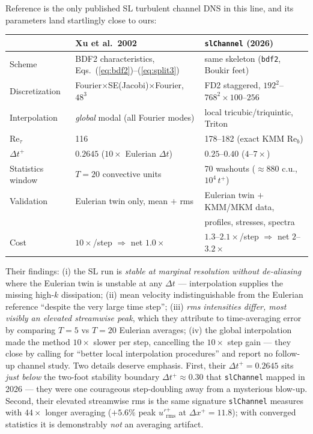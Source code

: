 \documentclass[11pt,a4paper]{article}
\newcommand{\Ret}{\mathrm{Re}_\tau}
\newcommand{\Reb}{\mathrm{Re}_b}
\newcommand{\dtp}{\Delta t^{+}}
\begin{document}
Reference \cite{xu02} is the only published SL turbulent channel DNS in this
line, and its parameters land startlingly close to ours:
\begin{center}
\begin{tabular}{lll}
\toprule
 & Xu et al.\ 2002 \cite{xu02} & \texttt{slChannel} (2026) \\
\midrule
Scheme & BDF2 characteristics, Eqs.~(\ref{eq:bdf2})--(\ref{eq:split3})
       & same skeleton (\texttt{bdf2}, Boukir feet) \\
Discretization & Fourier$\times$SE(Jacobi)$\times$Fourier, $48^3$
               & FD2 staggered, $192^2$--$768^2\times100$--$256$ \\
Interpolation & \emph{global} modal (all Fourier modes)
              & local tricubic/triquintic, Triton \\
$\Ret$ & 116 & 178--182 (exact KMM $\Reb$) \\
$\dtp$ & $0.2645$ ($10\times$ Eulerian $\Delta t$)
       & $0.25$--$0.40$ ($4$--$7\times$) \\
Statistics window & $T=20$ convective units
                  & 70 washouts ($\approx 880$ c.u., $10^4\,t^{+}$) \\
Validation & Eulerian twin only, mean $+$ rms
           & Eulerian twin $+$ KMM/MKM data, \\
 & & profiles, stresses, spectra \\
Cost & $10\times$/step $\Rightarrow$ net $1.0\times$
     & $1.3$--$2.1\times$/step $\Rightarrow$ net $2$--$3.2\times$ \\
\bottomrule
\end{tabular}
\end{center}
Their findings: (i) the SL run is \emph{stable at marginal resolution without
de-aliasing} where the Eulerian twin is unstable at any $\Delta t$ ---
interpolation supplies the missing high-$k$ dissipation; (ii) mean velocity
indistinguishable from the Eulerian reference ``despite the very large time
step''; (iii) \emph{rms intensities differ, most visibly an elevated
streamwise peak}, which they attribute to time-averaging error by comparing
$T=5$ vs $T=20$ Eulerian averages; (iv) the global interpolation made the
method $10\times$ slower per step, cancelling the $10\times$ step gain ---
they close by calling for ``better local interpolation procedures'' and
report no follow-up channel study. Two details deserve emphasis. First,
their $\dtp=0.2645$ sits \emph{just below} the two-foot stability boundary
$\dtp\approx0.30$ that \texttt{slChannel} mapped in 2026 --- they were one
courageous step-doubling away from a mysterious blow-up. Second, their
elevated streamwise rms is the same signature \texttt{slChannel} measures
with $44\times$ longer averaging ($+5.6\%$ peak $u'^{+}_{\mathrm{rms}}$ at
$\Delta x^{+}=11.8$); with converged statistics it is demonstrably \emph{not}
an averaging artifact.
\end{document}
